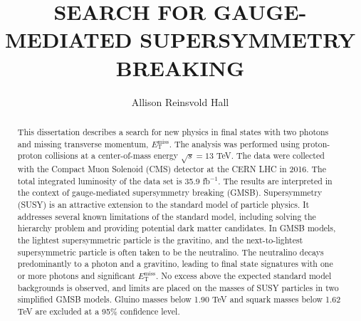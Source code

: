 \documentclass[final,numrefs,compress]{nddiss2e}
\begin{document}
\frontmatter         %

\title{ SEARCH FOR GAUGE-MEDIATED SUPERSYMMETRY BREAKING}            %
\author{Allison Reinsvold Hall }           %

\maketitle           %


  \begin{abstract}
This dissertation describes a search for new physics
in final states with two photons and missing transverse momentum, $E_{\mathrm{T}}^{\text{miss}}$. 
The analysis was performed using proton-proton collisions at a center-of-mass energy $\sqrt{s} = 13$ TeV. The data were collected with the Compact Muon Solenoid (CMS) detector at the CERN LHC in 2016. The total integrated luminosity of the data set is 35.9 fb$^{-1}$. 
The results are interpreted in the context of gauge-mediated supersymmetry breaking (GMSB).
Supersymmetry (SUSY) is an attractive extension to the standard model of particle physics. 
It addresses several known limitations of the standard model, 
including solving the hierarchy problem and providing potential dark matter candidates. 
In GMSB models, the lightest supersymmetric particle is the gravitino, and the next-to-lightest supersymmetric particle is often taken to be the neutralino. The neutralino decays predominantly to a photon and a gravitino, leading to final state signatures with one or more photons and significant $E_{\mathrm{T}}^{\text{miss}}$. 
No excess above the expected standard model backgrounds is observed, and 
limits are placed on the masses of SUSY particles in two simplified GMSB models. 
Gluino masses below 1.90 TeV and squark masses below 1.62 TeV are excluded at a 95\% confidence level.
  \end{abstract}
\end{document}
